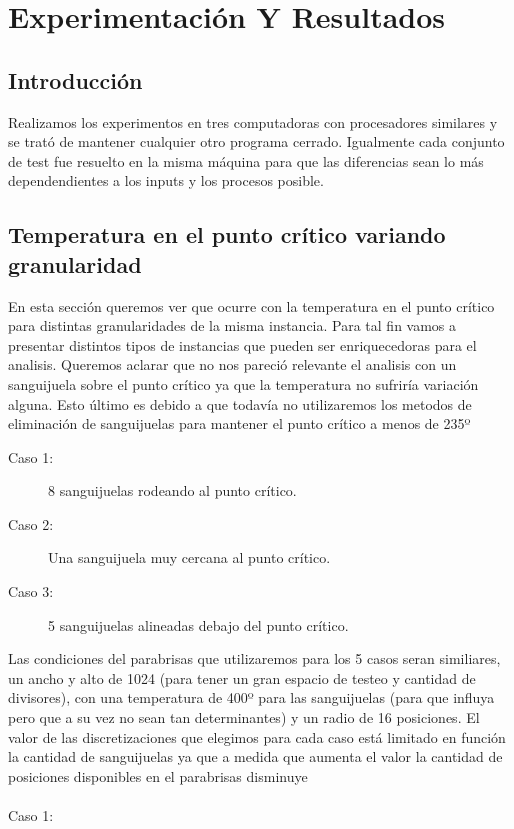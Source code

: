 \clearpage
\section{Experimentación Y Resultados}

\subsection{Introducción}
 Realizamos los experimentos en tres computadoras con procesadores similares y se trató de mantener cualquier otro programa cerrado. Igualmente cada conjunto de test fue resuelto en la misma máquina para que las diferencias sean lo más dependendientes a los inputs y los procesos posible.

\subsection{Temperatura en el punto crítico variando granularidad}

En esta sección queremos ver que ocurre con la temperatura en el punto crítico para distintas granularidades de la misma instancia. Para tal fin vamos a presentar distintos tipos de instancias que pueden ser enriquecedoras para el analisis. Queremos aclarar que no nos pareció relevante el analisis con un sanguijuela sobre el punto crítico ya que la temperatura no sufriría variación alguna. Esto último es debido a que todavía no utilizaremos los metodos de eliminación de sanguijuelas para mantener el punto crítico a menos de 235º

\begin{description}

\item[Caso 1:] 8 sanguijuelas rodeando al punto crítico.
\item[Caso 2:] Una sanguijuela muy cercana al punto crítico.
\item[Caso 3:] 5 sanguijuelas alineadas debajo del punto crítico.
\end{description}

Las condiciones del parabrisas que utilizaremos para los 5 casos seran similiares, un ancho y alto de 1024 (para tener un gran espacio de testeo y cantidad de divisores), con una temperatura de 400º para las sanguijuelas (para que influya pero que a su vez no sean tan determinantes) y un radio de 16 posiciones. El valor de las discretizaciones que elegimos para cada caso está limitado en función la cantidad de sanguijuelas ya que a medida que aumenta el valor la cantidad de posiciones disponibles en el parabrisas disminuye\\ \\
\newpage
Caso 1:


